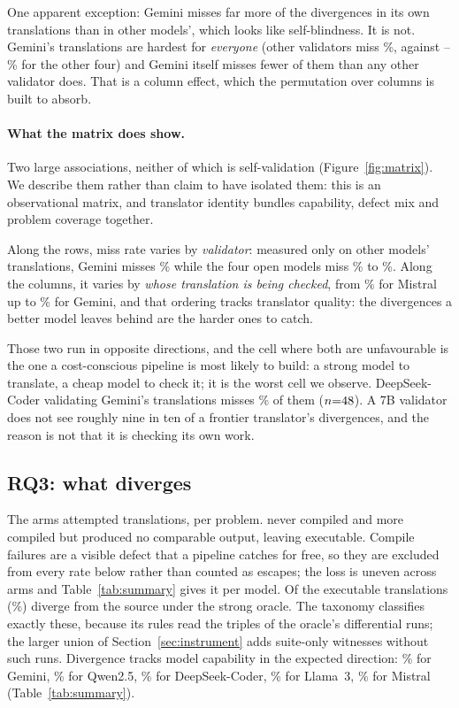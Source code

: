 \documentclass[sigconf]{acmart}
\begin{document}
One apparent exception: Gemini misses far more of the divergences in its own translations than
in other models', which looks like self-blindness. It is not. Gemini's translations are hardest
for \emph{everyone} (other validators miss \THardGemini\%, against \THardMistral--\THardQwen\%
for the other four) and Gemini itself misses fewer of them than any other validator does. That
is a column effect, which the permutation over columns is built to absorb.

\paragraph{What the matrix does show.}
Two large associations, neither of which is self-validation (Figure~\ref{fig:matrix}). We describe
them rather than claim to have isolated them: this is an observational matrix, and translator
identity bundles capability, defect mix and problem coverage together.

Along the rows, miss rate varies by \emph{validator}: measured only on other models'
translations, Gemini misses \VMissGemini\% while the four open models miss \VMissQwen\% to
\VMissMistral\%. Along the columns, it varies by \emph{whose translation is being checked}, from
\THardMistral\% for Mistral up to \THardGemini\% for Gemini, and that ordering tracks translator
quality: the divergences a better model leaves behind are the harder ones to catch.

Those two run in opposite directions, and the cell where both are unfavourable is the one a
cost-conscious pipeline is most likely to build: a strong model to translate, a cheap model to
check it; it is the worst cell we observe. DeepSeek-Coder validating Gemini's translations misses
\WorstCellMiss\% of them ($n{=}48$). A 7B validator does not see roughly nine in ten of
a frontier translator's divergences, and the reason is not that it is checking its own work.

\subsection{RQ3: what diverges}

The \NModels{} arms attempted \NAttempted{} translations, \NModels{} per problem.
\NCompileFail{} never compiled and \NNoComparable{} more compiled but produced no comparable
output, leaving \NUsable{} executable. Compile failures are a visible defect that a pipeline
catches for free, so they are excluded from every rate below rather than counted as escapes; the
loss is uneven across arms and Table~\ref{tab:summary} gives it per model. Of the executable
translations \NDivergent{}
(\DivRate\%) diverge from the source under the strong oracle. The taxonomy classifies exactly
these, because its rules read the triples of the oracle's differential runs; the larger union
of Section~\ref{sec:instrument} adds suite-only witnesses without such runs.
Divergence tracks model capability in the expected
direction: \DivGemini\% for Gemini, \DivQwen\% for Qwen2.5, \DivDsCoder\% for DeepSeek-Coder,
\DivLlama\% for Llama~3, \DivMistral\% for Mistral (Table~\ref{tab:summary}).
\end{document}
